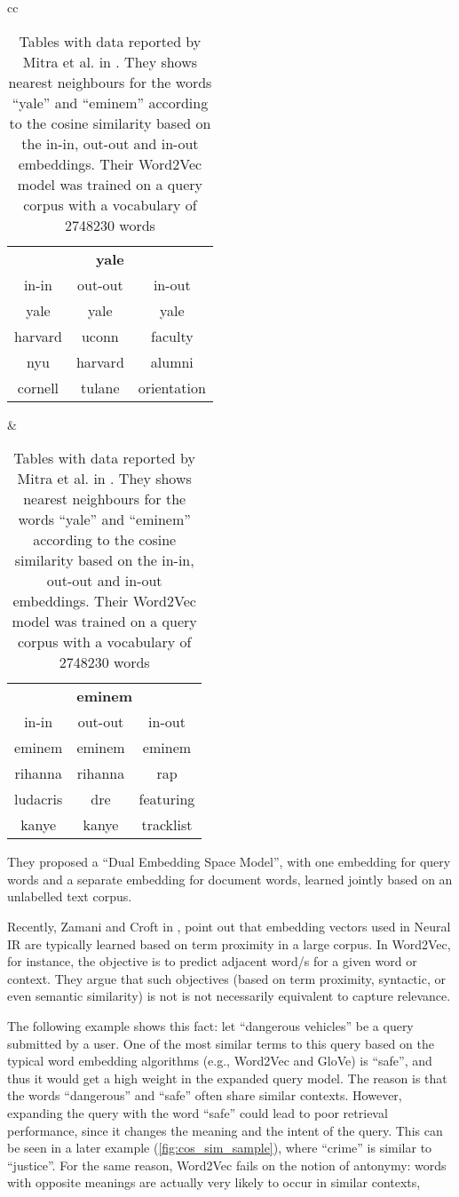 \begin{table}[H]
\centering
\begin{tabular}{cc}   %
\begin{tabular}{ccc}
\hline
\multicolumn{3}{c}{\textbf{yale}} \\
in-in & out-out & in-out \\ \hline
yale & yale & yale \\
harvard & uconn & faculty \\
nyu & harvard & alumni \\
cornell & tulane & orientation \\
\hline
\end{tabular} &
\begin{tabular}{ccc}
\hline
\multicolumn{3}{c}{\textbf{eminem}} \\
in-in & out-out & in-out \\ \hline
eminem & eminem & eminem \\
rihanna & rihanna & rap \\
ludacris & dre & featuring \\
kanye & kanye & tracklist \\
\hline
\end{tabular}
\end{tabular}
\caption{Tables with data reported by Mitra et al. in \cite{Mitra2016ADE}. They shows nearest neighbours for the words ``yale'' and ``eminem'' according to the cosine similarity based on the in-in, out-out and in-out embeddings. Their Word2Vec model was trained on a query corpus with a vocabulary of 2748230 words}
\label{tab:embsim}
\end{table}

They proposed a ``Dual Embedding Space Model'', with one embedding for query  words and a separate embedding for document words, learned jointly based on an unlabelled text corpus.

Recently, Zamani and Croft in \cite{relbasedwe}, point out that embedding vectors used in Neural IR are typically learned based on term proximity in a large corpus. In Word2Vec, for instance, the objective is to predict adjacent word/s for a given word or context. They argue that such objectives (based on term proximity, syntactic, or even semantic similarity) is not is not necessarily equivalent to capture relevance.

The following example shows this fact: let ``dangerous vehicles'' be a query submitted by a user. One of the most similar terms to this query based on the typical word embedding algorithms (e.g., Word2Vec and GloVe) is ``safe'', and thus it would get a high weight in the expanded query model. The reason is that the words ``dangerous'' and ``safe'' often share similar contexts. However, expanding the query with the word ``safe'' could lead to poor retrieval performance, since it changes the meaning and the intent of the query. This can be seen in a later example (\ref{fig:cos_sim_sample}), where ``crime'' is similar to ``justice''. For the same reason, Word2Vec fails on the notion of antonymy: words with opposite meanings are actually very likely to occur in similar contexts,

